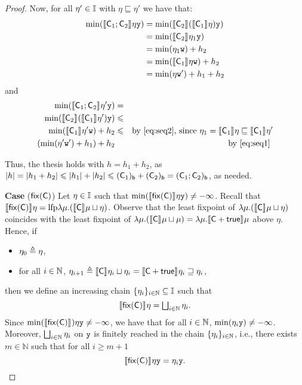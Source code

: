 \begin{proof}
  Now, for all \(\eta' \in \inte\) with \(\eta \sqsubseteq \eta'\) we have that:
  \begin{align*}
    \min(\semi{\com_1 \seq \com_2}\eta \var[y])
    &= \min(\semi{\com_2}(\semi{\com_1}\eta) \var[y])\\
    & = \min(\semi{\com_2}\eta_1 \var[y])\\
    & = \min(\eta_1 \var[w]) + h_2\\
    & = \min(\semi{\com_1}\eta \var[w]) + h_2\\
    & = \min(\eta \var[w]')+h_1 + h_2
  \end{align*}
  and
  \begin{align*}
    \min(\semi{\com_1 \seq \com_2}\eta' \var[y]) & = & \\ 
    \min(\semi{\com_2}(\semi{\com_1}\eta') \var[y]) & \leq & \\ 
    \min(\semi{\com_1}\eta' \var[w]) + h_2 & \leq & 
    \text{by \eqref{eq:seq2}, since } \eta_1 = \semi{\com_1}\eta \sqsubseteq \semi{\com_1}\eta' \\
    (\min(\eta' \var[w]') +h_1) + h_2 & & \text{by \eqref{eq:seq1}}\
  \end{align*}

  Thus, the thesis holds with \(h= h_1+h_2\), as
  \(|h| =|h_1 +h_2| \leq |h_1| + |h_2| \leq \lbound{\com_1} +
  \lbound{\com_2} = \lbound{\com_1 \seq \com_2}\), as needed.

  
  \medskip
  
  \noindent
  \textbf{Case} (\(\fix{\com}\)) 
  Let \(\eta \in \inte\) such that
  \(\min(\semi{\fix{\com}} \eta \var[y]) \neq - \infty\). Recall that
  \(\semi{\fix{\com}} \eta = \lfp{\lambda \mu. (\semi{\com} \mu
    \sqcup\eta)}\). Observe that the least fixpoint of
  \(\lambda \mu. (\semi{\com} \mu \sqcup\eta)\) coincides with the
  least fixpoint of
  \(\lambda \mu. (\semi{\com} \mu \sqcup \mu) = \lambda \mu. \semi{
    \com\ndet \tru} \mu\) above \(\eta\). Hence, if
  \begin{itemize}
  \item \(\eta_0 \veq \eta\),
  \item for all \(i\in \nat\),
    \(\eta_{i+1} \veq \semi{\com} \eta_i \sqcup \eta_i= \semi{\com \ndet
    \tru} \eta_i \sqsupseteq \eta_i\),
  \end{itemize}
  then we define an increasing chain \(\{\eta_i\}_{i\in \nat}\subseteq \inte\) such that
  \[ 
  \semi{\fix{\com}} \eta = \textstyle\bigsqcup_{i \in \nat} \eta_i.
  \]
  Since \(\min(\semi{\fix{\com}}) \eta \var[y] \neq -\infty\), we have
  that for all \(i\in \nat\), \(\min(\eta_i \var[y]) \neq
  -\infty\). Moreover, \(\textstyle\bigsqcup_{i \in \nat} \eta_i\) on
  \(\var[y]\) is finitely reached in the chain
  \(\{\eta_i\}_{i\in \nat}\), i.e., there exists \(m \in \mathbb{N}\)
  such that for all \(i \geq m+1\)
  \[
  \semi{\fix{\com}} \eta \var[y] = \eta_{i} \var[y].
  \]


\end{proof}

